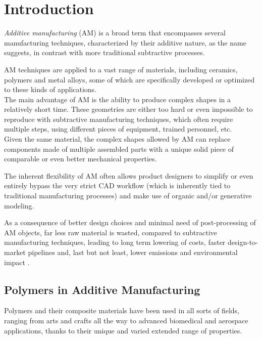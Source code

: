 \documentclass{article}
\begin{document}
    \section{Introduction\label{Intro}}

    \textit{Additive manufacturing} (AM) is a broad term that encompasses several manufacturing techniques, characterized by their additive nature, as the name suggests, 
    in contrast with more traditional subtractive processes.
    
    AM techniques are applied to a vast range of materials, including ceramics, polymers and metal alloys, some of which are specifically developed or optimized to 
    these kinds of applications. \\ 
    
    The main advantage of AM is the ability to produce complex shapes in a relatively short time. 
    These geometries are either too hard or even impossible to reproduce with subtractive manufacturing techniques, which often require multiple steps, using different 
    pieces of equipment, trained personnel, etc. \\

    Given the same material, the complex shapes allowed by AM can replace components made of multiple assembled parts with a unique solid piece of comparable or even better mechanical properties. 
    
    The inherent flexibility of AM often allows product designers to simplify or even entirely bypass the very strict CAD workflow (which is inherently tied to 
    traditional manufacturing processes) and make use of organic and/or generative modeling. 

    As a consequence of better design choices and minimal need of post-processing of AM objects, far less raw material is wasted, compared to subtractive manufacturing techniques, leading to 
    long term lowering of costs, faster design-to-market pipelines and, last but not least, lower emissions and environmental impact \autocite*{Recent_progress_polymers_AM}. 

    \subsection{Polymers in Additive Manufacturing\label{Polymers_in_AM}}

    Polymers and their composite materials have been used in all sorts of fields, ranging from arts and crafts all the way to advanced biomedical and aerospace applications, thanks 
    to their unique and varied extended range of properties. \\  
    
\end{document}
